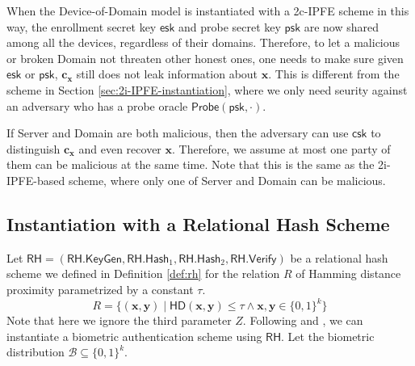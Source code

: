 When the Device-of-Domain model is instantiated with a 2c-IPFE scheme in this way, the enrollment secret key $\textsf{esk}$ and probe secret key $\textsf{psk}$ are now shared among all the devices, regardless of their domains. Therefore, to let a malicious or broken \textsf{Domain} not threaten other honest ones, one needs to make sure given $\textsf{esk}$ or $\textsf{psk}$, $\mathbf{c_x}$ still does not leak information about $\mathbf{x}$. This is different from the scheme in Section \ref{sec:2i-IPFE-instantiation}, where we only need seurity against an adversary who has a probe oracle $\textsf{Probe}(\textsf{psk}, \cdot)$.

If \textsf{Server} and \textsf{Domain} are both malicious, then the adversary can use $\textsf{csk}$ to distinguish $\mathbf{c_x}$ and even recover $\mathbf{x}$. Therefore, we assume at most one party of them can be malicious at the same time. Note that this is the same as the 2i-IPFE-based scheme, where only one of \textsf{Server} and \textsf{Domain} can be malicious.


\subsection{Instantiation with a Relational Hash Scheme}
\label{sec:rh-instantiation}

Let $\textsf{RH} = (\textsf{RH.KeyGen}, \textsf{RH.Hash}_1, \textsf{RH.Hash}_2, \textsf{RH.Verify})$ be a relational hash scheme we defined in Definition \ref{def:rh} for the relation $R$ of Hamming distance proximity parametrized by a constant $\tau$.
\[
	R = \{ (\mathbf{x}, \mathbf{y}) \mid \textsf{HD}(\mathbf{x}, \mathbf{y}) \leq \tau \wedge \mathbf{x}, \mathbf{y} \in \{0,1\}^k \}
\]
Note that here we ignore the third parameter $Z$.
Following \cite{cryptoeprint:2023/481} and \cite{cryptoeprint:2014/394}, we can instantiate a biometric authentication scheme using $\textsf{RH}$.  Let the biometric distribution $\mathcal{B} \subseteq \{0,1\}^k$.

